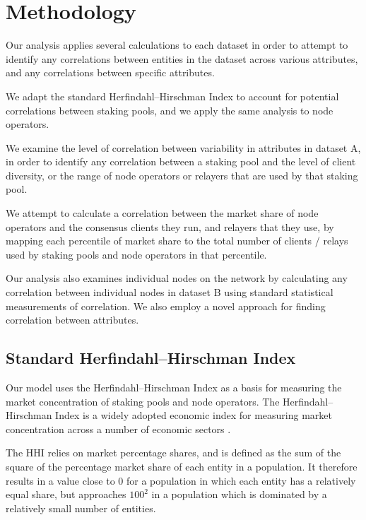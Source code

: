 \documentclass[conference]{IEEEtran}
\begin{document}
\section{Methodology}
\label{sec:methodology}

Our analysis applies several calculations to each dataset in order to attempt to identify any correlations between entities in the dataset across various attributes, and any correlations between specific attributes.

We adapt the standard Herfindahl–Hirschman Index to account for potential correlations between staking pools, and we apply the same analysis to node operators.

We examine the level of correlation between variability in attributes in dataset A, in order to identify any correlation between a staking pool and the level of client diversity, or the range of node operators or relayers that are used by that staking pool.

We attempt to calculate a correlation between the market share of node operators and the consensus clients they run, and relayers that they use, by mapping each percentile of market share to the total number of clients / relays used by staking pools and node operators in that percentile.

Our analysis also examines individual nodes on the network by calculating any correlation between individual nodes in dataset B using standard statistical measurements of correlation.  We also employ a novel approach for finding correlation between attributes.

\subsection{Standard Herfindahl–Hirschman Index}

Our model uses the Herfindahl–Hirschman Index as a basis for measuring the market concentration of staking pools and node operators.  The Herfindahl–Hirschman Index is a widely adopted economic index for measuring market concentration across a number of economic sectors \cite{OECD2021}.

The HHI relies on market percentage shares, and is defined as the sum of the square of the percentage market share of each entity in a population.  It therefore results in a value close to 0 for a population in which each entity has a relatively equal share, but approaches $100^2$ in a population which is dominated by a relatively small number of entities.
\end{document}
